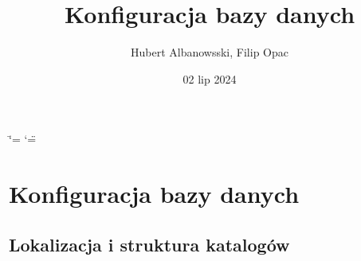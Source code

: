 \documentclass[letterpaper,10pt,polish]{sphinxmanual}
\title{Konfiguracja bazy danych}
\date{02 lip 2024}
\author{Hubert Albanowsski, Filip Opac}
\begin{document}
\ifdefined\shorthandoff
  \ifnum\catcode`\=\string=\active\shorthandoff{=}\fi
  \ifnum\catcode`\"=\active{}\fi
\fi

\pagestyle{empty}
\sphinxmaketitle
\pagestyle{plain}
\sphinxtableofcontents
\pagestyle{normal}
\label{\detokenize{index::doc}}


\sphinxstepscope


\chapter{Konfiguracja bazy danych}
\label{\detokenize{Konfiguracja-bazy-danych:konfiguracja-bazy-danych}}\label{\detokenize{Konfiguracja-bazy-danych::doc}}

\section{Lokalizacja i struktura katalogów}
\label{\detokenize{Konfiguracja-bazy-danych:lokalizacja-i-struktura-katalogow}}
\end{document}
